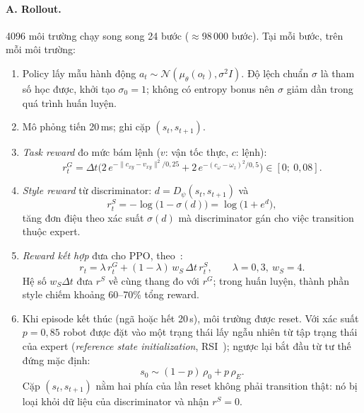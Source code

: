 \documentclass[11pt,a4paper]{article}
\begin{document}
\paragraph{A. Rollout.} 4096 môi trường chạy song song 24 bước ($\approx$98\,000 bước). Tại
mỗi bước, trên mỗi môi trường:
\begin{enumerate}[leftmargin=*,itemsep=2pt]
  \item Policy lấy mẫu hành động $a_t \sim \mathcal{N}(\mu_\theta(o_t), \sigma^2 I)$. Độ lệch
    chuẩn $\sigma$ là tham số học được, khởi tạo $\sigma_0 = 1$; không có entropy bonus nên
    $\sigma$ giảm dần trong quá trình huấn luyện.
  \item Mô phỏng tiến 20\,ms; ghi cặp $(s_t, s_{t+1})$.
  \item \emph{Task reward} đo mức bám lệnh ($v$: vận tốc thực, $c$: lệnh):
    \begin{equation}
      r^G_t = \Delta t\Big(2\,e^{-\|c_{xy} - v_{xy}\|^2 / 0{,}25}
      + 2\,e^{-(c_\omega - \omega_z)^2 / 0{,}5}\Big) \in [0;\ 0{,}08].
      \label{eq:task}
    \end{equation}
  \item \emph{Style reward} từ discriminator: $d = D_\psi(s_t, s_{t+1})$ và
    \begin{equation}
      r^S_t = -\log\big(1 - \sigma(d)\big) = \log\big(1 + e^{d}\big),
      \label{eq:gail-reward}
    \end{equation}
    tăng đơn điệu theo xác suất $\sigma(d)$ mà discriminator gán cho việc transition thuộc
    expert.
  \item \emph{Reward kết hợp} đưa cho PPO, theo~\cite{escontrela2022}:
    \begin{equation}
      r_t = \lambda\, r^G_t + (1 - \lambda)\, w_S\,\Delta t\, r^S_t,
      \qquad \lambda = 0{,}3,\ w_S = 4 .
      \label{eq:mix}
    \end{equation}
    Hệ số $w_S \Delta t$ đưa $r^S$ về cùng thang đo với $r^G$; trong huấn luyện, thành phần
    style chiếm khoảng 60--70\% tổng reward.
  \item Khi episode kết thúc (ngã hoặc hết 20\,s), môi trường được reset. Với xác suất
    $p = 0{,}85$ robot được đặt vào một trạng thái lấy ngẫu nhiên từ tập trạng thái của
    expert (\emph{reference state initialization}, RSI~\cite{peng2021amp}); ngược lại bắt
    đầu từ tư thế đứng mặc định:
    \begin{equation}
      s_0 \sim (1 - p)\,\rho_0 + p\,\rho_E .
      \label{eq:rsi}
    \end{equation}
    Cặp $(s_t, s_{t+1})$ nằm hai phía của lần reset không phải transition thật: nó bị loại
    khỏi dữ liệu của discriminator và nhận $r^S = 0$.
\end{enumerate}
\end{document}
